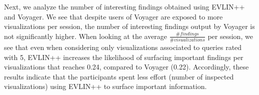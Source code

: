  Next, we analyze the number of interesting findings obtained using EVLIN++ and Voyager. 
 We see that despite users of Voyager are exposed to more visualizations per session, the number of interesting findings output by Voyager is not significantly higher.
 When looking at the average $\frac{\#findings}{\#visualizations}$ per session, we see that even when considering only visualizations associated to queries rated with 5, EVLIN++ increases the likelihood of surfacing important findings per visualizations that reaches 0.24, compared to Voyager (0.22). %
Accordingly, these results indicate that the participants spent less effort (number of inspected visualizations) using EVLIN++ to surface important information.

